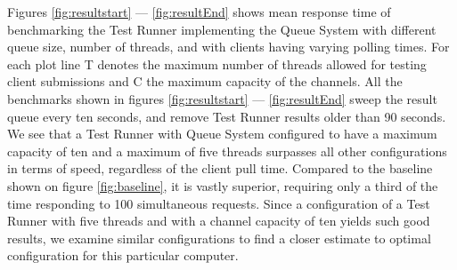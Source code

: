 Figures \ref{fig:resultstart} --- \ref{fig:resultEnd} shows mean response time of benchmarking the Test Runner implementing the Queue System with different queue size, number of threads, and with clients having varying polling times. For each plot line T denotes the maximum number of threads allowed for testing client submissions and C the maximum capacity of the channels. 
All the benchmarks shown in figures \ref{fig:resultstart} --- \ref{fig:resultEnd} sweep the result queue every ten seconds, and remove Test Runner results older than 90 seconds. 
We see that a Test Runner with Queue System configured to have a maximum capacity of ten and a maximum of five threads surpasses all other configurations in terms of speed, regardless of the client pull time. 
Compared to the baseline shown on figure \ref{fig:baseline}, it is vastly superior, requiring only a third of the time responding to 100 simultaneous requests. 
Since a configuration of a Test Runner with five threads and with a channel capacity of ten yields such good results, we examine similar configurations to find a closer estimate to optimal configuration for this particular computer. 